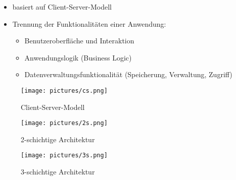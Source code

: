 \documentclass[12pt,a4paper]{article}
\begin{document}
\begin{itemize}
\item basiert auf Client-Server-Modell
\item Trennung der Funktionalitäten einer Anwendung:
\begin{itemize}
\item Benutzeroberfläche und Interaktion
\item Anwendungslogik (Business Logic)
\item Datenverwaltungsfunktionalität (Speicherung, Verwaltung, Zugriff)
\end{itemize}
\end{itemize}

\begin{figure}[H]
\centering
\begin{minipage}[t]{0.32\textwidth}
\centering
\texttt{[image: pictures/cs.png]}
\caption{Client-Server-Modell}
\end{minipage}
\hfill
\begin{minipage}[t]{0.32\textwidth}
\centering
\texttt{[image: pictures/2s.png]}
\caption{2-schichtige Architektur}
\end{minipage}
\hfill
\begin{minipage}[t]{0.32\textwidth}
\centering
\texttt{[image: pictures/3s.png]}
\caption{3-schichtige Architektur}
\end{minipage}
\end{figure}
\end{document}
